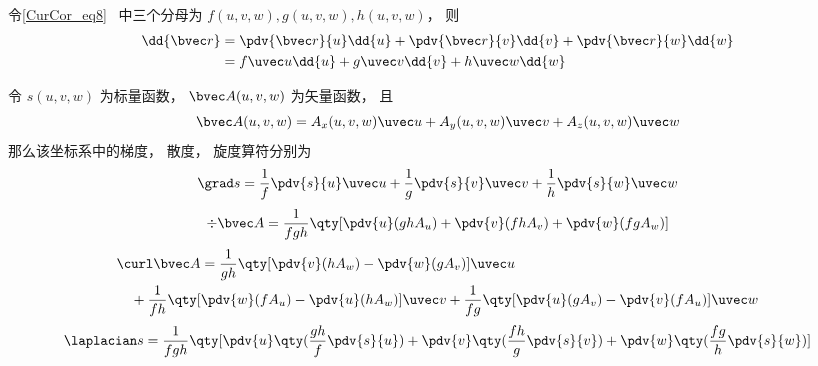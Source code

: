 
令\autoref{CurCor_eq8}~ 中三个分母为 $f(u,v,w), g(u,v,w), h(u,v,w)$， 则
\begin{equation}\label{CVecOp_eq4}
\begin{aligned}
\dd{\bvec r} &= \pdv{\bvec r}{u}\dd{u} + \pdv{\bvec r}{v}\dd{v} + \pdv{\bvec r}{w}\dd{w}\\
&= f\uvec u\dd{u} + g\uvec v\dd{v} + h\uvec w\dd{w}
\end{aligned}
\end{equation}

令 $s(u, v, w)$ 为标量函数， $\bvec A(u, v, w)$ 为矢量函数， 且
\begin{equation}
\bvec A(u, v, w) = A_x(u, v, w)\uvec u + A_y(u, v, w)\uvec v + A_z(u, v, w)\uvec w
\end{equation}
那么该坐标系中的梯度， 散度， 旋度算符分别为
\begin{equation}
\grad s = \frac{1}{f} \pdv{s}{u}\uvec u + \frac{1}{g}\pdv{s}{v} \uvec v + \frac{1}{h} \pdv{s}{w}\uvec w
\end{equation}
\begin{equation}
\div \bvec A = \frac{1}{fgh}\qty[\pdv{u}(ghA_u) + \pdv{v}(fhA_v) + \pdv{w}(fgA_w)]
\end{equation}
\begin{equation}
\begin{aligned}
&\curl \bvec A = \frac{1}{gh}\qty[\pdv{v}(hA_w) - \pdv{w}(gA_v)]\uvec u\\
&\quad + \frac{1}{fh}\qty[\pdv{w}(fA_u) - \pdv{u}(hA_w)]\uvec v
+ \frac{1}{fg}\qty[\pdv{u}(gA_v) - \pdv{v}(fA_u)]\uvec w
\end{aligned}
\end{equation}
\begin{equation}\label{CVecOp_eq6}
\laplacian s = \frac{1}{fgh}\qty[\pdv{u}\qty(\frac{gh}{f}\pdv{s}{u}) + \pdv{v}\qty(\frac{fh}{g}\pdv{s}{v}) + \pdv{w}\qty(\frac{fg}{h}\pdv{s}{w})]
\end{equation}


